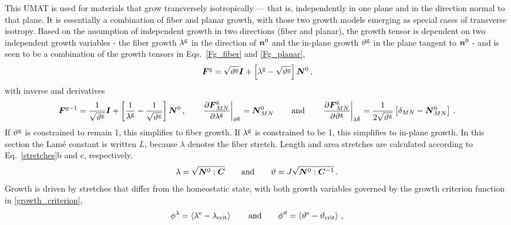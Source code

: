 \documentclass[10pt,letterpaper,oneside]{report}
\newcommand{\ten}[1]{\mbox{\boldmath $#1$}{}}
\newcommand{\scas}[1]{\mbox{{\scriptsize{${\rm{#1}}$}}}{}}
\begin{document}
This UMAT is used for materials that grow transversely isotropically --- that is, independently in one plane and in the direction normal to that plane.  It is essentially a combination of fiber and planar growth, with those two growth models emerging as special cases of transverse isotropy.  Based on the assumption of independent growth in two directions (fiber and planar), the growth tensor is dependent on two independent growth variables - the fiber growth $\lambda^{\scas{g}}$ in the direction of $\ten{n}^0$ and the in-plane growth $\vartheta^{\scas{g}}$ in the plane tangent to $\ten{n}^0$ - and is seen to be a combination of the growth tensors in Eqs.~\ref{Fg_fiber} and \ref{Fg_planar},
\begin{equation}
\ten{F}^{\scas{g}} = \sqrt{\vartheta^{\scas{g}}} \ten{I} + \left[ \lambda^{\scas{g}} - \sqrt{\vartheta^{\scas{g}}} \right] \ten{N}^0 \, , 
\end{equation} 
with inverse and derivatives 
\begin{equation}
\ten{F}^{\scas{g}-1} = \frac{1}{\sqrt{\vartheta^{\scas{g}}}} \ten{I} + \left[ \frac{1}{\lambda^{\scas{g}}} - \frac{1}{\sqrt{\vartheta^{\scas{g}}}} \right] \ten{N}^0 \, ,
\qquad
\left. \frac{\partial \ten{F}^{\scas{g}}_{MN} }{\partial \lambda^{\scas{g}}} \right|_{\vartheta^{\scas{g}}} = \ten{N}^0_{MN} \, 
\qquad \text{and} \qquad
\left. \frac{\partial \ten{F}^{\scas{g}}_{MN} }{\partial \vartheta^{\scas{g}}} \right|_{\lambda^{\scas{g}}} = \frac{1}{2\sqrt{\vartheta^{\scas{g}}}} \left[ \delta_{MN} - \ten{N}^0_{MN} \right] \, .
\end{equation}
If $\vartheta^{\scas{g}}$ is constrained to remain 1, this simplifies to fiber growth.  If $\lambda^{\scas{g}}$ is constrained to be 1, this simplifies to in-plane growth.  In this section the Lamé constant is written $L$, because $\lambda$ denotes the fiber stretch.  
Length and area stretches are calculated according to Eq.~\ref{stretches}b and c, respectively,
\begin{equation*}
\lambda = \sqrt{ \ten{N}^0 : \ten{C} } 
\qquad \text{and} \qquad 
\vartheta = J \sqrt{ \ten{N}^0 : \ten{C}^{-1} } \, . 
\end{equation*}
Growth is driven by stretches that differ from the homeostatic state, with both growth variables governed by the growth criterion function in \autoref{growth_criterion},
\begin{equation*}
\phi^{\lambda} = \left\langle \lambda^{\scas{e}} - \lambda_{\scas{crit}} \right\rangle 
\qquad \text{and} \qquad 
\phi^{\vartheta} = \left\langle \vartheta^{\scas{e}} - \vartheta_{\scas{crit}} \right\rangle \, , 
\end{equation*}
\end{document}
